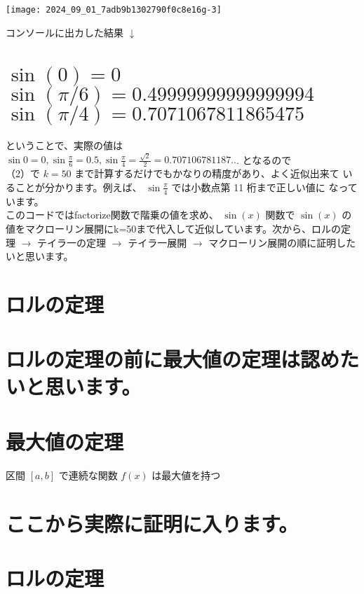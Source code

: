 \documentclass[10pt]{article}
\begin{document}
\begin{center}
\texttt{[image: 2024\_09\_01\_7adb9b1302790f0c8e16g-3]}
\end{center}

コンソールに出カした結果 $\downarrow$

\section*{$\sin (0)=0$ \\
 $\sin (\pi / 6)=0.49999999999999994$ \\
 $\sin (\pi / 4)=0.7071067811865475$}
ということで、実際の値は\\
$\sin 0=0, \sin \frac{\pi}{6}=0.5, \sin \frac{\pi}{4}=\frac{\sqrt{2}}{2}=0.707106781187 . .$. となるので\\
（2）で $k=50$ まで計算するだけでもかなりの精度があり、よく近似出来て いることが分かります。例えば、 $\sin \frac{\pi}{4}$ では小数点第 11 桁まで正しい値に なっています。\\
このコードではfactorize関数で階乗の値を求め、 $\sin (x)$ 関数で $\sin (x)$ の 値をマクローリン展開にk=50まで代入して近似しています。次から、ロルの定理 $\rightarrow$ テイラ一の定理 $\rightarrow$ テイラ一展開 $\rightarrow$ マクローリン展開の順に証明したいと思います。

\section*{ロルの定理}
\section*{ロルの定理の前に最大値の定理は認めたいと思います。}
\section*{最大値の定理}
区間 $[a, b]$ で連続な関数 $f(x)$ は最大値を持つ

\section*{ここから実際に証明に入ります。}
\section*{ロルの定理}
\end{document}
